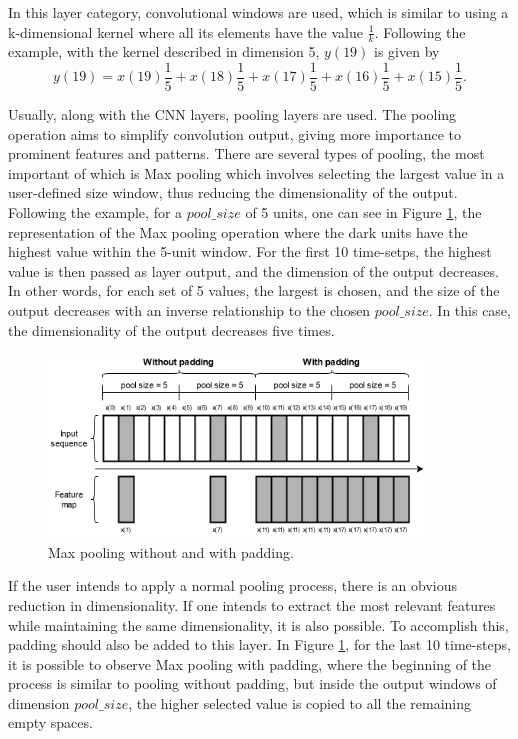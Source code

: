 In this layer category, convolutional windows are used, which is similar to using a k-dimensional kernel where all its elements have the value $\frac{1}{k}$. Following the example, with the kernel described in dimension 5, $y(19)$ is given by
\begin{equation}
        y(19)=x(19)\frac{1}{5}+x(18)\frac{1}{5}+x(17)\frac{1}{5}+x(16)\frac{1}{5}+x(15)\frac{1}{5}.
    \label{19}
\end{equation}



Usually, along with the \ac{CNN} layers, pooling layers are used. The pooling operation aims to simplify convolution output, giving more importance to prominent features and patterns. There are several types of pooling, the most important of which is Max pooling which involves selecting the largest value in a user-defined size window, thus reducing the dimensionality of the output. Following the example, for a $pool\_size$ of 5 units, one can see in Figure \ref{maxpooling}, the representation of the Max pooling operation where the dark units have the highest value within the 5-unit window. For the first 10 time-setps, the highest value is then passed as layer output, and the dimension of the output decreases. In other words, for each set of 5 values, the largest is chosen, and the size of the output decreases with an inverse relationship to the chosen $pool\_size$. In this case, the dimensionality of the output decreases five times.

\begin{figure}[h!]
    \centering
    \begin{center}
    \includegraphics[width=0.9\textwidth]{Images/maxpooling.png}
    \caption{Max pooling without and with padding.}
    \label{maxpooling}
    \end{center}
\end{figure}

If the user intends to apply a normal pooling process, there is an obvious reduction in dimensionality. If one intends to extract the most relevant features while maintaining the same dimensionality, it is also possible. To accomplish this, padding should also be added to this layer. In Figure \ref{maxpooling}, for the last 10 time-steps, it is possible to observe Max pooling with padding, where the beginning of the process is similar to pooling without padding, but inside the output windows of dimension $pool\_size$, the higher selected value is copied to all the remaining empty spaces. 

